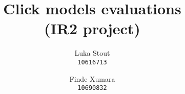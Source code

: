 \documentclass{llncs} %
\title{
Click models evaluations\\
\small {(IR2 project)}
}
\author{
Luka Stout\\
\texttt{10616713} \\
\and
Finde Xumara \\
\texttt{10690832} \\
}
\begin{document}
\nocite{*}
\maketitle








{}


\newpage

\end{document}
